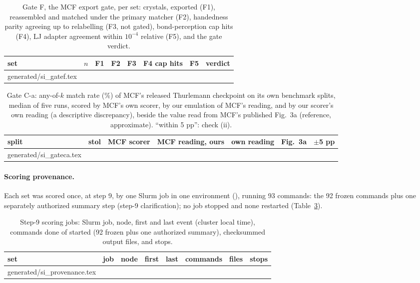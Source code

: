 \documentclass[journal=acsodf,manuscript=article]{achemso}
\makeatletter
\newcommand{\inputrows}[1]{\@@input #1 }
\makeatother
\begin{document}
\begin{table}[htbp]
\caption{Gate F, the MCF export gate, per set: crystals, exported (F1), reassembled and matched
under the primary matcher (F2), handedness parity agreeing up to relabelling (F3, not gated),
bond-perception cap hits (F4), LJ adapter agreement within $10^{-4}$ relative (F5), and the
gate verdict.}
\label{tab:si_gatef}
\centering
\scriptsize
\setlength{\tabcolsep}{3pt}
\begin{tabular}{@{}lrrrrlp{3.6cm}l@{}}
\toprule
set & $n$ & F1 & F2 & F3 & F4 cap hits & F5 & verdict \\
\midrule
\inputrows{generated/si_gatef.tex}
\bottomrule
\end{tabular}
\end{table}

\begin{table}[htbp]
\caption{Gate C-a: any-of-$k$ match rate (\%) of MCF's released Thurlemann checkpoint on its own
benchmark splits, median of five runs, scored by MCF's own scorer, by our emulation of MCF's
reading, and by our scorer's own reading (a descriptive discrepancy), beside the value read
from MCF's published Fig.~3a (reference, approximate). ``within 5 pp'': check (ii).}
\label{tab:si_gateca}
\centering
\footnotesize
\setlength{\tabcolsep}{4pt}
\begin{tabular}{@{}p{3.0cm}cccccc@{}}
\toprule
split & stol & MCF scorer & MCF reading, ours & own reading & Fig.~3a & $\pm$5 pp \\
\midrule
\inputrows{generated/si_gateca.tex}
\bottomrule
\end{tabular}
\end{table}

\paragraph{Scoring provenance.} Each set was scored once, at step 9, by one Slurm job in one
environment (\svScoreEnv), running 93 commands: the 92 frozen commands plus one separately
authorized summary step (step-9 clarification); no job stopped and none restarted
(Table~\ref{tab:si_prov}).

\begin{table}[htbp]
\caption{Step-9 scoring jobs: Slurm job, node, first and last event (cluster local time),
commands done of started (92 frozen plus one authorized summary), checksummed output
files, and stops.}
\label{tab:si_prov}
\centering
\footnotesize
\begin{tabular}{@{}llllllrl@{}}
\toprule
set & job & node & first & last & commands & files & stops \\
\midrule
\inputrows{generated/si_provenance.tex}
\bottomrule
\end{tabular}
\end{table}
\end{document}
